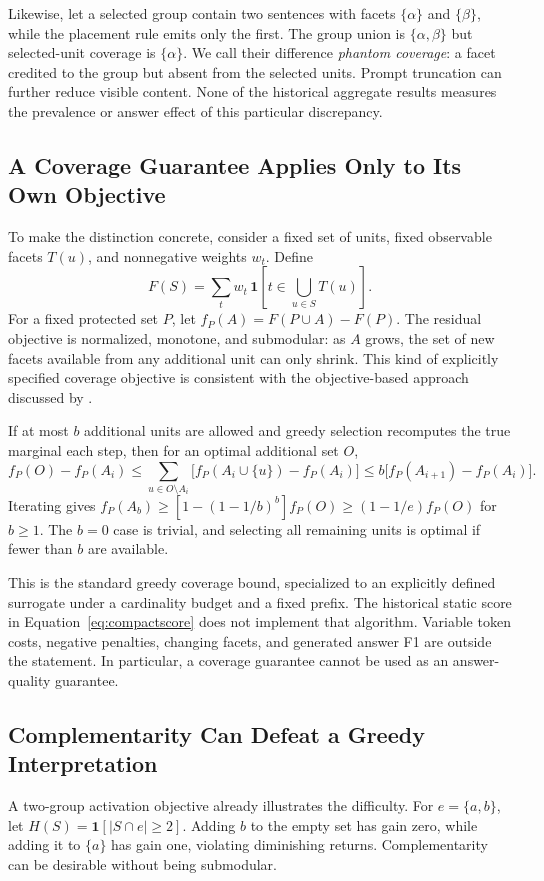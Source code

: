 \documentclass[11pt,a4paper]{article}
\begin{document}
Likewise, let a selected group contain two sentences with facets
$\{\alpha\}$ and $\{\beta\}$, while the placement rule emits only the first.
The group union is $\{\alpha,\beta\}$ but selected-unit coverage is
$\{\alpha\}$. We call their difference \emph{phantom coverage}: a facet
credited to the group but absent from the selected units. Prompt truncation
can further reduce visible content. None of the historical aggregate results
measures the prevalence or answer effect of this particular discrepancy.

\subsection{A Coverage Guarantee Applies Only to Its Own Objective}
To make the distinction concrete, consider a fixed set of units, fixed
observable facets $T(u)$, and nonnegative weights $w_t$. Define
\begin{equation}
F(S)=\sum_t w_t\,\mathbf{1}\left[t\in\bigcup_{u\in S}T(u)\right].
\end{equation}
For a fixed protected set $P$, let $f_P(A)=F(P\cup A)-F(P)$.
The residual objective is normalized, monotone, and submodular: as $A$ grows,
the set of new facets available from any additional unit can only shrink.
This kind of explicitly specified coverage objective is consistent with the
objective-based approach discussed by \citet{lin2011submodular}.

If at most $b$ additional units are allowed and greedy selection recomputes
the true marginal each step, then for an optimal additional set $O$,
\begin{equation}
f_P(O)-f_P(A_i)\leq
\sum_{u\in O\setminus A_i}\big[f_P(A_i\cup\{u\})-f_P(A_i)\big]
\leq b\big[f_P(A_{i+1})-f_P(A_i)\big].
\end{equation}
Iterating gives
$f_P(A_b)\geq[1-(1-1/b)^b]f_P(O)\geq(1-1/e)f_P(O)$ for $b\geq1$.
The $b=0$ case is trivial, and selecting all remaining units is optimal if
fewer than $b$ are available.

This is the standard greedy coverage bound, specialized to an explicitly defined surrogate under a
cardinality budget and a fixed prefix. The historical static score in
Equation~\ref{eq:compactscore} does not implement that algorithm.
Variable token costs, negative penalties, changing facets, and generated
answer F1 are outside the statement. In particular, a coverage guarantee
cannot be used as an answer-quality guarantee.

\subsection{Complementarity Can Defeat a Greedy Interpretation}
A two-group activation objective already illustrates the difficulty.
For $e=\{a,b\}$, let $H(S)=\mathbf{1}[|S\cap e|\geq2]$.
Adding $b$ to the empty set has gain zero, while adding it to $\{a\}$ has gain
one, violating diminishing returns. Complementarity can be desirable without
being submodular.
\end{document}
